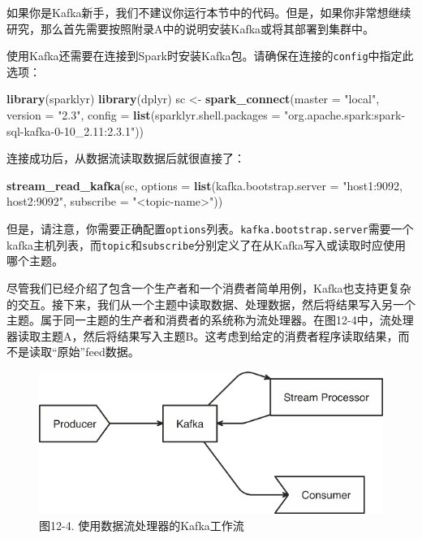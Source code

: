\documentclass[
]{article}
\newenvironment{Shaded}{\begin{snugshade}}{\end{snugshade}}
\newcommand{\DataTypeTok}[1]{\textcolor[rgb]{0.13,0.29,0.53}{#1}}
\newcommand{\KeywordTok}[1]{\textcolor[rgb]{0.13,0.29,0.53}{\textbf{#1}}}
\newcommand{\NormalTok}[1]{#1}
\newcommand{\StringTok}[1]{\textcolor[rgb]{0.31,0.60,0.02}{#1}}
\begin{document}
如果你是Kafka新手，我们不建议你运行本节中的代码。但是，如果你非常想继续研究，那么首先需要按照附录A中的说明安装Kafka或将其部署到集群中。

使用Kafka还需要在连接到Spark时安装Kafka包。请确保在连接的\texttt{config}中指定此选项：

\begin{Shaded}
\begin{Highlighting}[]
\KeywordTok{library}\NormalTok{(sparklyr)}
\KeywordTok{library}\NormalTok{(dplyr)}
\NormalTok{sc <-}\StringTok{ }\KeywordTok{spark_connect}\NormalTok{(}\DataTypeTok{master =} \StringTok{"local"}\NormalTok{, }\DataTypeTok{version =} \StringTok{"2.3"}\NormalTok{, }\DataTypeTok{config =} \KeywordTok{list}\NormalTok{(}\DataTypeTok{sparklyr.shell.packages =} \StringTok{"org.apache.spark:spark-sql-kafka-0-10_2.11:2.3.1"}\NormalTok{))}
\end{Highlighting}
\end{Shaded}

连接成功后，从数据流读取数据后就很直接了：

\begin{Shaded}
\begin{Highlighting}[]
\KeywordTok{stream_read_kafka}\NormalTok{(sc, }\DataTypeTok{options =} \KeywordTok{list}\NormalTok{(}\DataTypeTok{kafka.bootstrap.server =} \StringTok{"host1:9092, host2:9092"}\NormalTok{, }
    \DataTypeTok{subscribe =} \StringTok{"<topic-name>"}\NormalTok{))}
\end{Highlighting}
\end{Shaded}

但是，请注意，你需要正确配置\texttt{options}列表。\texttt{kafka.bootstrap.server}需要一个kafka主机列表，而\texttt{topic}和\texttt{subscribe}分别定义了在从Kafka写入或读取时应使用哪个主题。

尽管我们已经介绍了包含一个生产者和一个消费者简单用例，Kafka也支持更复杂的交互。接下来，我们从一个主题中读取数据、处理数据，然后将结果写入另一个主题。属于同一主题的生产者和消费者的系统称为流处理器。在图12-4中，流处理器读取主题A，然后将结果写入主题B。这考虑到给定的消费者程序读取结果，而不是读取``原始''feed数据。

\begin{figure}
\centering
\includegraphics{figures/12_4.png}
\caption{图12-4. 使用数据流处理器的Kafka工作流}
\end{figure}
\end{document}
